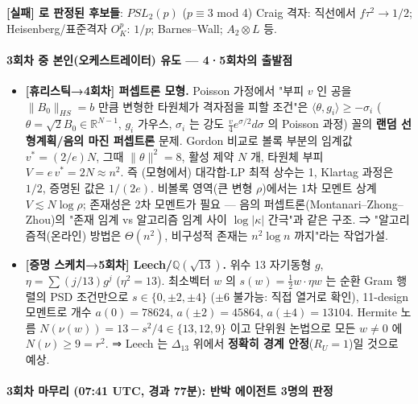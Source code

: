 \textbf{{[}실패{]} 로 판정된 후보들}: \(PSL_2(p)\) (\(p\equiv3\) mod 4) Craig 격자: 직선에서 \(f\tau^2\to1/2\); Heisenberg/표준격자 \(O_K^p\): \(1/p\); Barnes--Wall; \(A_2\otimes L\) 등.

\hypertarget{uxd68cuxcc28-uxc911-uxbcf8uxc778uxc624uxcf00uxc2a4uxd2b8uxb808uxc774uxd130-uxc720uxb3c4-45uxd68cuxcc28uxc758-uxcd9cuxbc1cuxc810}{%
\paragraph{3회차 중 본인(오케스트레이터) 유도 --- 4·5회차의 출발점}\label{uxd68cuxcc28-uxc911-uxbcf8uxc778uxc624uxcf00uxc2a4uxd2b8uxb808uxc774uxd130-uxc720uxb3c4-45uxd68cuxcc28uxc758-uxcd9cuxbc1cuxc810}}

\begin{itemize}
\tightlist
\item
  \textbf{{[}휴리스틱→4회차{]} 퍼셉트론 모형.} Poisson 가정에서 "부피 \(v\) 인 공을 \(\|B_0\|_{HS}=b\) 만큼 변형한 타원체가 격자점을 피할 조건"은 \(\langle\theta,g_i\rangle\ge-\sigma_i\) (\(\theta=\sqrt2B_0\in\mathbb R^{N-1}\), \(g_i\) 가우스, \(\sigma_i\) 는 강도 \(\frac v4e^{\sigma/2}d\sigma\) 의 Poisson 과정) 꼴의 \textbf{랜덤 선형계획/음의 마진 퍼셉트론} 문제. Gordon 비교로 볼록 부분의 임계값 \(v^*=(2/e)N\), 그때 \(\|\theta\|^2=8\), 활성 제약 \(N\) 개, 타원체 부피 \(V=e\,v^*=2N\approx n^2\). 즉 (모형에서) 대각합-LP 최적 상수는 1, Klartag 과정은 \(1/2\), 증명된 값은 \(1/(2e)\). 비볼록 영역(큰 변형 \(\rho\))에서는 1차 모멘트 상계 \(V\lesssim N\log\rho\); 존재성은 2차 모멘트가 필요 --- 음의 퍼셉트론(Montanari--Zhong--Zhou)의 "존재 임계 vs 알고리즘 임계 사이 \(\log|\kappa|\) 간극"과 같은 구조. ⇒ "알고리즘적(온라인) 방법은 \(\Theta(n^2)\), 비구성적 존재는 \(n^2\log n\) 까지"라는 작업가설.
\item
  \textbf{{[}증명 스케치→5회차{]} Leech/\(\mathbb Q(\sqrt{13})\).} 위수 13 자기동형 \(g\), \(\eta=\sum(j/13)g^j\) (\(\eta^2=13\)). 최소벡터 \(w\) 의 \(s(w)=\tfrac12w\cdot\eta w\) 는 순환 Gram 행렬의 PSD 조건만으로 \(s\in\{0,\pm2,\pm4\}\) (\(\pm6\) 불가능: 직접 열거로 확인), 11-design 모멘트로 개수 \(a(0)=78624\), \(a(\pm2)=45864\), \(a(\pm4)=13104\). Hermite 노름 \(N(\nu(w))=13-s^2/4\in\{13,12,9\}\) 이고 단위원 논법으로 모든 \(w\ne0\) 에 \(N(\nu)\ge9=r^2\). ⇒ Leech 는 \(\Delta_{13}\) 위에서 \textbf{정확히 경계 안정}(\(R_U=1\))일 것으로 예상.
\end{itemize}

\hypertarget{uxd68cuxcc28-uxb9c8uxbb34uxb9ac-0741-utc-uxacbduxacfc-77uxbd84-uxbc18uxbc15-uxc5d0uxc774uxc804uxd2b8-3uxba85uxc758-uxd310uxc815}{%
\paragraph{3회차 마무리 (07:41 UTC, 경과 77분): 반박 에이전트 3명의 판정}\label{uxd68cuxcc28-uxb9c8uxbb34uxb9ac-0741-utc-uxacbduxacfc-77uxbd84-uxbc18uxbc15-uxc5d0uxc774uxc804uxd2b8-3uxba85uxc758-uxd310uxc815}}

